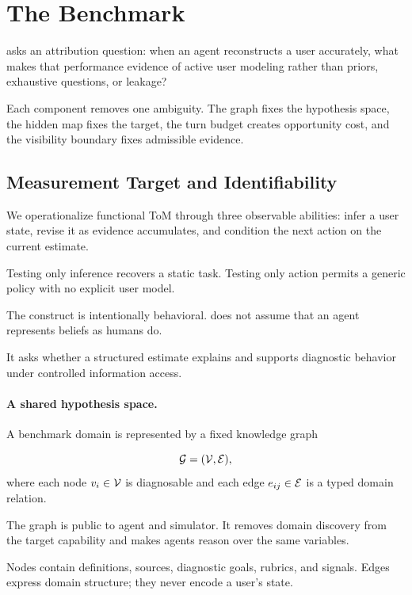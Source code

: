 \section{The \knowact Benchmark}
\label{sec:benchmark}

\knowact asks an attribution question: when an agent reconstructs a user accurately, what makes that
performance evidence of active user modeling rather than priors, exhaustive questions, or leakage?

Each component removes one ambiguity. The graph fixes the hypothesis space, the hidden map fixes the
target, the turn budget creates opportunity cost, and the visibility boundary fixes admissible evidence.

\subsection{Measurement Target and Identifiability}
\label{sec:formulation}

We operationalize functional ToM through three observable abilities: infer a user state, revise it as
evidence accumulates, and condition the next action on the current estimate.

Testing only inference recovers a static task. Testing only action permits a generic policy with no
explicit user model.

The construct is intentionally behavioral. \knowact does not assume that an agent represents beliefs as
humans do.

It asks whether a structured estimate explains and supports diagnostic behavior under controlled
information access.

\paragraph{A shared hypothesis space.}
A benchmark domain is represented by a fixed knowledge graph

\begin{equation}
    \mathcal{G} = (\mathcal{V}, \mathcal{E}),
\end{equation}
where each node $v_i \in \mathcal{V}$ is diagnosable and each edge $e_{ij} \in \mathcal{E}$ is a typed domain
relation.

The graph is public to agent and simulator. It removes domain discovery from the target capability and
makes agents reason over the same variables.

Nodes contain definitions, sources, diagnostic goals, rubrics, and signals. Edges express domain
structure; they never encode a user's state.

